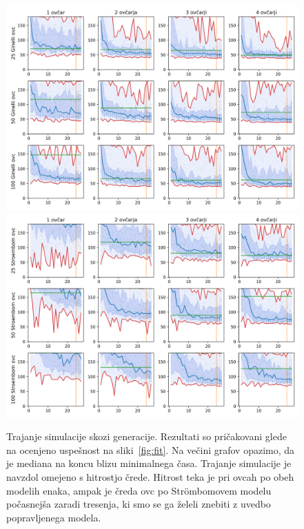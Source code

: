 \begin{figure}[H]  %
\centering
\includegraphics[height=0.4\textheight]{../poglavja/grafi/Ginelli-evolucija-MaxT.png}
\includegraphics[height=0.4\textheight]{../poglavja/grafi/Stroembom-evolucija-MaxT.png}
\caption[Trajanje simulacije skozi generacije]{Trajanje simulacije skozi generacije. Rezultati so pričakovani glede na ocenjeno uspešnost na sliki~\ref{fig:fit}. Na večini grafov opazimo, da je mediana na koncu blizu minimalnega časa. Trajanje simulacije je navzdol omejeno s hitrostjo črede. Hitrost teka je pri ovcah po obeh modelih enaka, ampak je čreda ovc po Str{\"o}mbomovem modelu počasnejša zaradi tresenja, ki smo se ga želeli znebiti z uvedbo popravljenega modela.} %
\label{fig:maxt}
\end{figure}

